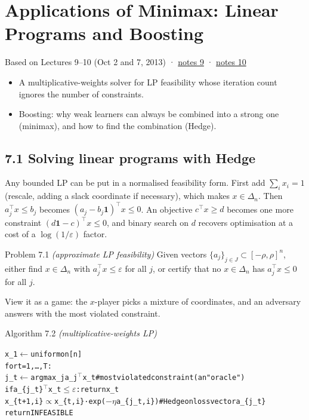 \documentclass[11pt,a4paper,openany]{book}
\newcommand{\eps}{\varepsilon}
\newcommand{\simplex}{\Delta}
\newcommand{\chapsource}[1]{{\small\sffamily\color{muted}#1\par}\medskip}
\newenvironment{algo}{\par\smallskip\begingroup\footnotesize\begin{alltt}}{\end{alltt}\endgroup\smallskip}
\begin{document}
\chapter[Linear programs and boosting]{Applications of Minimax: Linear Programs and Boosting}\label{ch7}
\chapsource{Based on Lectures 9–10 (Oct 2 and 7, 2013) · \href{https://web.eecs.umich.edu/~jabernet/eecs598course/fall2013/web/notes/lec9_100213.pdf}{notes 9} · \href{https://web.eecs.umich.edu/~jabernet/eecs598course/fall2013/web/notes/lec10_100713.pdf}{notes 10}}

\begin{goals}
\begin{itemize}
\item A multiplicative-weights solver for LP feasibility whose iteration count ignores the number of constraints.
\item Boosting: why weak learners can always be combined into a strong one (minimax), and how to find the combination (Hedge).
\end{itemize}
\end{goals}

\section*{7.1 Solving linear programs with Hedge}\label{ch7-lp}

Any bounded LP can be put in a normalised feasibility form. First add $\sum_ix_i=1$ (rescale, adding a slack coordinate if necessary), which makes $x\in\simplex_n$. Then $a_j^\top x\le b_j$ becomes $(a_j-b_j\mathbf1)^\top x\le0$. An objective $c^\top x\ge d$ becomes one more constraint $(d\mathbf1-c)^\top x\le0$, and binary search on $d$ recovers optimisation at a cost of a $\log(1/\eps)$ factor.

\begin{bdef}{Problem 7.1 \emph{(approximate LP feasibility)}}
Given vectors $\{a_j\}_{j\in J}\subset[-\rho,\rho]^n$, either find $x\in\simplex_n$ with $a_j^\top x\le\eps$ for all $j$, or certify that no $x\in\simplex_n$ has $a_j^\top x\le0$ for all $j$.
\end{bdef}

View it as a game: the $x$-player picks a mixture of coordinates, and an adversary answers with the most violated constraint.

\begin{balg}{Algorithm 7.2 \emph{(multiplicative-weights LP)}}
\begin{algo}
x\_1 \ensuremath{\leftarrow} uniform on [n]
for t = 1, …, T:
    j\_t \ensuremath{\leftarrow} argmax\_j  a\_j\ensuremath{^{\top}} x\_t                 \# most violated constraint (an "oracle")
    if a\_\{j\_t\}\ensuremath{^{\top}} x\_t \ensuremath{\le} \ensuremath{\varepsilon}:  return x\_t
    x\_\{t+1,i\} \ensuremath{\propto} x\_\{t,i\} · exp(\ensuremath{-}\ensuremath{\eta} a\_\{j\_t,i\})   \# Hedge on loss vector a\_\{j\_t\}
return INFEASIBLE
\end{algo}
\end{balg}
\end{document}

